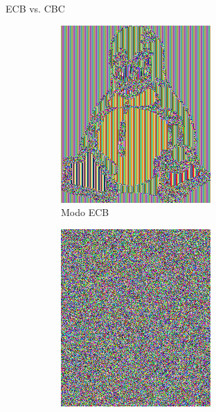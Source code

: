 \begin{frame}{ECB vs. CBC}
\begin{figure}[h!]
\begin{subfigure}[b]{0.3\textwidth}
      \includegraphics[width=\textwidth]{../images/Tux-ecb.png}
      \caption{Modo ECB}
    \end{subfigure}
    \hfill
    \begin{subfigure}[b]{0.3\textwidth}
      \centering 
      \includegraphics[width=\textwidth]{../images/Tux-cbc.png}

\end{subfigure}
\end{figure}
\end{frame}

